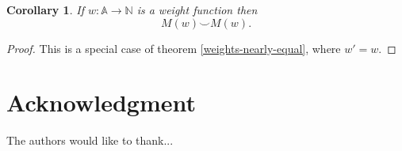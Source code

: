 \documentclass[journal]{IEEEtran}
\newtheorem{corollary}[theorem]{Corollary}
\begin{document}
\begin{corollary} \label{weights-equal} If $w : \mathbb A \to \mathbb N$ is a
weight function then \[M(w) \smile M(w).\]  \end{corollary}

\begin{proof}
This is a special case of theorem \ref{weights-nearly-equal}, where $w' = w$.
\end{proof}

\section*{Acknowledgment}


The authors would like to thank...


\ifCLASSOPTIONcaptionsoff
  \newpage
\fi





%
%
%

% 
\end{document}
